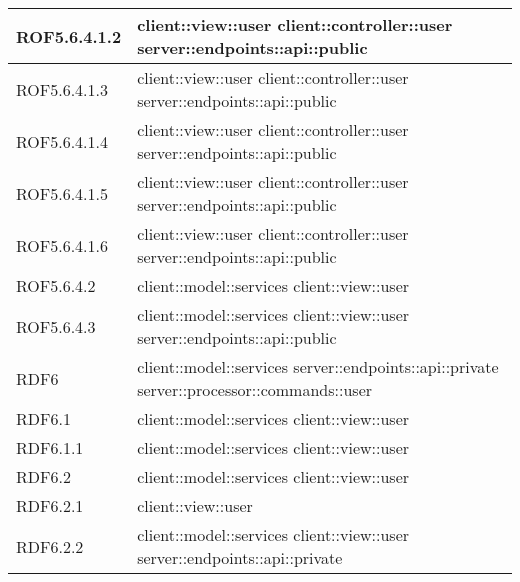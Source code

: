 \begin{center}
\begin{longtable}{| p{4cm} | p{8cm} |}
\hline
ROF5.6.4.1.2 & client::view::user \newline client::controller::user \newline server::endpoints::api::public \\
\hline
ROF5.6.4.1.3 & client::view::user \newline client::controller::user \newline server::endpoints::api::public \\
\hline
ROF5.6.4.1.4 & client::view::user \newline client::controller::user \newline server::endpoints::api::public \\
\hline
ROF5.6.4.1.5 & client::view::user \newline client::controller::user \newline server::endpoints::api::public \\
\hline
ROF5.6.4.1.6 & client::view::user \newline client::controller::user \newline server::endpoints::api::public \\
\hline
ROF5.6.4.2 & client::model::services \newline client::view::user \\
\hline
ROF5.6.4.3 & client::model::services \newline client::view::user \newline server::endpoints::api::public \\
\hline
RDF6 & client::model::services \newline server::endpoints::api::private \newline server::processor::commands::user \\
\hline
RDF6.1 & client::model::services \newline client::view::user \\
\hline
RDF6.1.1 & client::model::services \newline client::view::user \\
\hline
RDF6.2 & client::model::services \newline client::view::user \\
\hline
RDF6.2.1 & client::view::user \\
\hline
RDF6.2.2 & client::model::services \newline client::view::user \newline server::endpoints::api::private \\
\hline

\end{longtable}
\end{center}
